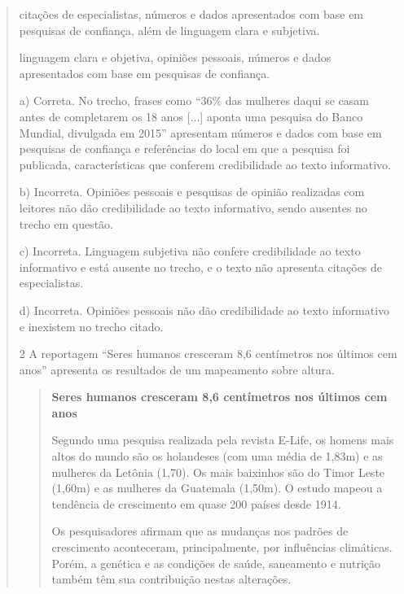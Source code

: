 \begin{escolha}
\begin{escolha}
\begin{quote}
\begin{escolha}
\item citações de especialistas, números e dados apresentados com base em
pesquisas de confiança, além de linguagem clara e subjetiva.

\item linguagem clara e objetiva, opiniões pessoais, números e dados
apresentados com base em pesquisas de confiança.
\end{escolha}


a)  Correta. No trecho, frases como ``36\% das mulheres daqui se casam
antes de completarem os 18 anos {[}...{]} aponta uma pesquisa do Banco
Mundial, divulgada em 2015'' apresentam números e dados com base em
pesquisas de confiança e referências do local em que a pesquisa foi
publicada, características que conferem credibilidade ao texto
informativo.

b)  Incorreta. Opiniões pessoais e pesquisas de opinião realizadas com
leitores não dão credibilidade ao texto informativo, sendo ausentes no
trecho em questão.

c)  Incorreta. Linguagem subjetiva não confere credibilidade ao texto
informativo e está ausente no trecho, e o texto não apresenta citações
de especialistas.

d)  Incorreta. Opiniões pessoais não dão credibilidade ao texto
informativo e inexistem no trecho citado.

\num{2} A reportagem ``Seres humanos cresceram 8,6 centímetros nos últimos cem
anos'' apresenta os resultados de um mapeamento sobre altura.

\begin{quote}
\textbf{Seres humanos cresceram 8,6 centímetros nos últimos cem anos}

Segundo uma pesquisa realizada pela revista E-Life, os homens mais altos
do mundo são os holandeses (com uma média de 1,83m) e as mulheres da
Letônia (1,70). Os mais baixinhos são do Timor Leste (1,60m) e as
mulheres da Guatemala (1,50m). O estudo mapeou a tendência de
crescimento em quase 200 países desde 1914.

Os pesquisadores afirmam que as mudanças nos padrões de crescimento
aconteceram,
principalmente, por influências climáticas. Porém, a genética e as
condições de saúde,
saneamento e nutrição também têm sua contribuição nestas alterações.


\end{quote}
\end{quote}
\end{escolha}
\end{escolha}
